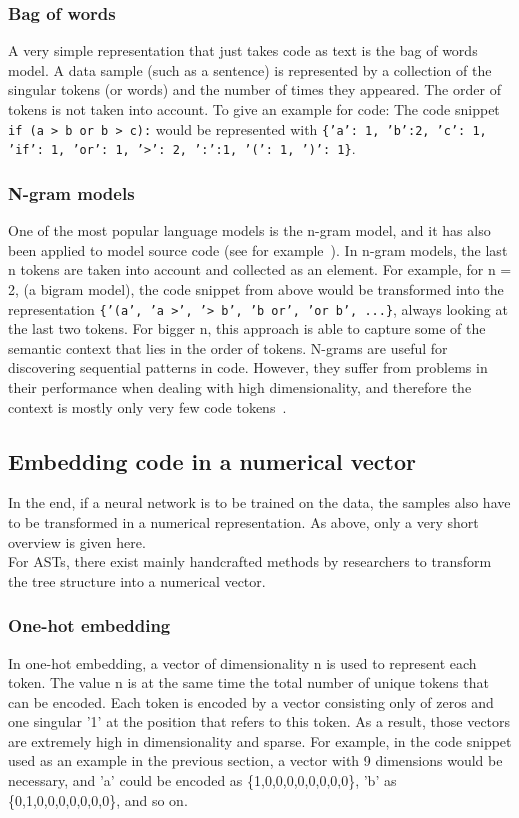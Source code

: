 \documentclass[
a4paper,
pagesize,
pdftex,
12pt,
twoside, %
BCOR=5mm, %
ngerman,
fleqn,
final,
]{scrartcl}
\begin{document}
	\subsubsection{Bag of words}\label{bag-of-words}
	A very simple representation that just takes code as text is the bag of words model. A data sample (such as a sentence) is represented by a collection of the singular tokens (or words) and the number of times they appeared. The order of tokens is not taken into account. To give an example for code: The code snippet \texttt{if (a > b or b > c):} would be represented with \texttt{\{'a': 1, 'b':2, 'c': 1, 'if': 1, 'or': 1, '>': 2, ':':1, '(': 1, ')': 1\}}.
	
	\subsubsection{N-gram models}\label{n-gram}
	One of the most popular language models is the n-gram model, and it has also been applied to model source code (see for example~\cite{Pang.2015}). In n-gram models, the last n tokens are taken into account and collected as an element. For example, for n = 2, (a bigram model), the code snippet from above would be transformed into the representation \texttt{\{'(a', 'a >', '> b', 'b or', 'or b', ...\}}, always looking at the last two tokens. For bigger n, this approach is able to capture some of the semantic context that lies in the order of tokens. N-grams are useful for discovering sequential patterns in code. However, they suffer from problems in their performance when dealing with high dimensionality, and therefore the context is mostly only very few code tokens~\cite{Dam.2016}.
	
	
	\subsection{Embedding code in a numerical vector}
	In the end, if a neural network is to be trained on the data, the samples also have to be transformed in a numerical representation. As above, only a very short overview is given here.\\
	For ASTs, there exist mainly handcrafted methods by researchers to transform the tree structure into a numerical vector.
	
	\subsubsection{One-hot embedding}\label{one-hot}
	In one-hot embedding, a vector of dimensionality n is used to represent each token. The value n is at the same time the total number of unique tokens that can be encoded. Each token is encoded by a vector consisting only of zeros and one singular '1' at the position that refers to this token. As a result, those vectors are extremely high in dimensionality and sparse. For example, in the code snippet used as an example in the previous section, a vector with 9 dimensions would be necessary, and 'a' could be encoded as \{1,0,0,0,0,0,0,0,0\}, 'b' as \{0,1,0,0,0,0,0,0,0\}, and so on.
	
\end{document}

